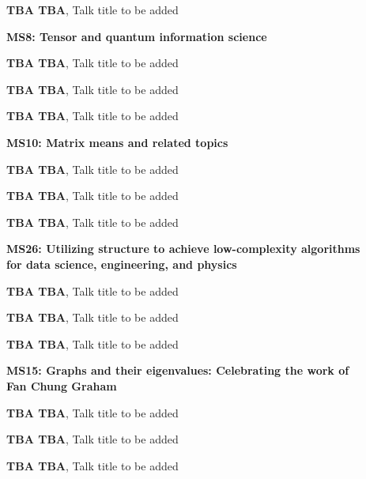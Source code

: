 \documentclass[ILAS2025-program.tex]{subfiles}
\begin{document}
\begin{description}
\begin{description}
        \item[] \textbf{TBA TBA}, Talk title to be added
        \end{description}
    \begin{description}
    \item[] \textbf{MS8: Tensor and quantum information science} 
    \item[] \textbf{TBA TBA}, Talk title to be added
        \item[] \textbf{TBA TBA}, Talk title to be added
        \item[] \textbf{TBA TBA}, Talk title to be added
        \end{description}
    \begin{description}
    \item[] \textbf{MS10: Matrix means and related topics} 
    \item[] \textbf{TBA TBA}, Talk title to be added
        \item[] \textbf{TBA TBA}, Talk title to be added
        \item[] \textbf{TBA TBA}, Talk title to be added
        \end{description}
    \begin{description}
    \item[] \textbf{MS26: Utilizing structure to achieve low-complexity algorithms for data science, engineering, and physics} 
    \item[] \textbf{TBA TBA}, Talk title to be added
        \item[] \textbf{TBA TBA}, Talk title to be added
        \item[] \textbf{TBA TBA}, Talk title to be added
        \end{description}
    \begin{description}
    \item[] \textbf{MS15: Graphs and their eigenvalues: Celebrating the work of Fan Chung Graham} 
    \item[] \textbf{TBA TBA}, Talk title to be added
        \item[] \textbf{TBA TBA}, Talk title to be added
        \item[] \textbf{TBA TBA}, Talk title to be added

\end{description}
\end{description}
\end{document}
